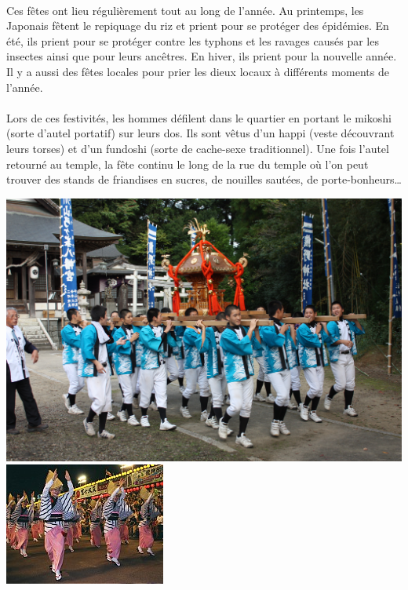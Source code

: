 \paragraph{}
Ces fêtes ont lieu régulièrement tout au long de l’année. Au printemps, les Japonais fêtent le repiquage du riz et prient pour se protéger des épidémies. En été, ils prient pour se protéger contre les typhons et les ravages causés par les insectes ainsi que pour leurs ancêtres.  En hiver, ils prient pour la nouvelle année. Il y a aussi des fêtes locales pour prier les dieux locaux à différents moments de l’année. 
\paragraph{}
Lors de ces festivités, les hommes défilent dans le quartier en portant le mikoshi (sorte d’autel portatif) sur leurs dos. Ils sont vêtus d’un happi (veste découvrant leurs torses) et d’un fundoshi (sorte de cache-sexe traditionnel). Une fois l’autel retourné au temple, la fête continu le long de la rue du temple où l’on peut trouver des stands de friandises en sucres, de nouilles sautées, de porte-bonheurs… 
\begin{center}
\includegraphics[scale=0.07]{mikoshi.jpg}
\includegraphics[scale=1.3]{odori.jpg}
\end{center}
